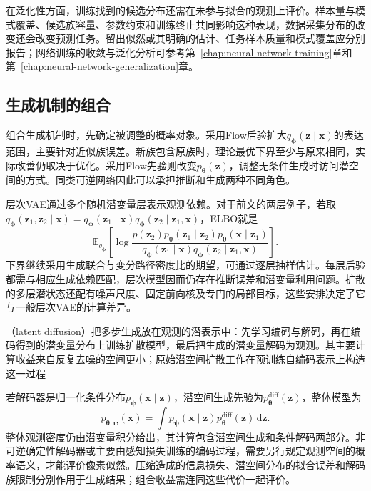 在泛化性方面，训练找到的候选分布还需在未参与拟合的观测上评价。样本量与模式覆盖、候选族容量、参数约束和训练终止共同影响这种表现，数据采集分布的改变还会改变预测任务。留出似然或其明确的估计、任务样本质量和模式覆盖应分别报告；网络训练的收敛与泛化分析可参考第~\ref{chap:neural-network-training}章和第~\ref{chap:neural-network-generalization}章。

\subsection{生成机制的组合}
\label{sec:pgm-generative-hybrids}

组合生成机制时，先确定被调整的概率对象。采用Flow后验扩大$q_{\bm{\phi}}(\bm{z}\mid\bm{x})$的表达范围，主要针对近似族误差。新族包含原族时，理论最优下界至少与原来相同，实际改善仍取决于优化。采用Flow先验则改变$p_{\bm{\theta}}(\bm{z})$，调整无条件生成时访问潜空间的方式。同类可逆网络因此可以承担推断和生成两种不同角色。

层次VAE通过多个随机潜变量层表示观测依赖。对于前文的两层例子，若取$q_{\bm{\phi}}(\bm{z}_1,\bm{z}_2\mid\bm{x})=q_{\bm{\phi}}(\bm{z}_1\mid\bm{x})q_{\bm{\phi}}(\bm{z}_2\mid\bm{z}_1,\bm{x})$，ELBO就是
\[
  \mathbb{E}_{q_{\bm{\phi}}}
  \left[
    \log\frac{
      p(\bm{z}_2)p_{\bm{\theta}}(\bm{z}_1\mid\bm{z}_2)
          p_{\bm{\theta}}(\bm{x}\mid\bm{z}_1)}
      {q_{\bm{\phi}}(\bm{z}_1\mid\bm{x})
          q_{\bm{\phi}}(\bm{z}_2\mid\bm{z}_1,\bm{x})}
  \right].
\]
下界继续采用生成联合与变分路径密度比的期望，可通过逐层抽样估计。每层后验都需与相应生成依赖匹配，层次模型因而仍存在推断误差和潜变量利用问题。扩散的多层潜状态还配有噪声尺度、固定前向核及专门的局部目标，这些安排决定了它与一般层次VAE的计算差异。

（latent diffusion）把多步生成放在观测的潜表示中：先学习编码与解码，再在编码得到的潜变量分布上训练扩散模型，最后把生成的潜变量解码为观测。其主要计算收益来自反复去噪的空间更小；原始潜空间扩散工作在预训练自编码表示上构造这一过程

若解码器是归一化条件分布$p_{\bm{\psi}}(\bm{x}\mid\bm{z})$，潜空间生成先验为$p_{\bm{\theta}}^{\mathrm{diff}}(\bm{z})$，整体模型为
\begin{equation}
  \label{eq:pgm-generative-latent-diffusion}
  p_{\bm{\theta},\bm{\psi}}(\bm{x})
  =\int p_{\bm{\psi}}(\bm{x}\mid\bm{z})
          p_{\bm{\theta}}^{\mathrm{diff}}(\bm{z})\,\mathrm{d}\bm{z}.
\end{equation}
整体观测密度仍由潜变量积分给出，其计算包含潜空间生成和条件解码两部分。非可逆确定性解码器或主要由感知损失训练的编码过程，需要另行规定观测空间的概率语义，才能评价像素似然。压缩造成的信息损失、潜空间分布的拟合误差和解码族限制分别作用于生成结果；组合收益需连同这些代价一起评价。

